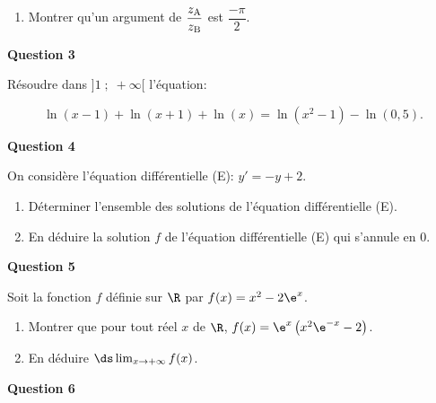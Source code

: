 \begin{enumerate}
\item Montrer qu'un argument de $\dfrac{z_{\text A}}{z_{\text B}}$ est $\dfrac{-\pi}{2}$.
\end{enumerate}

\bigskip

\textbf{Question 3}

\medskip

Résoudre dans $]1\;;\; +\infty[$ l'équation:

\[\ln\left (x-1\right ) + \ln \left (x+1\right ) + \ln\left (x\right ) = \ln \left (x^2-1\right) - \ln\left (0,5\right).\]

\bigskip

\textbf{Question 4}

\medskip

On considère l'équation différentielle (E): $y'=-y+2$.

\begin{enumerate}
\item Déterminer l'ensemble des solutions de l'équation différentielle (E).
\item En déduire la solution $f$ de l'équation différentielle (E) qui s'annule en 0.
\end{enumerate}

\bigskip

\textbf{Question 5}

\medskip

Soit la fonction $f$ définie sur $\R$ par $f(x)=x^2-2\e^{x}$.

\begin{enumerate}
\item  Montrer que pour tout réel $x$ de $\R$, $f(x)=\e^{x}\left (x^2\e^{-x}-2\right )$.
\item En déduire $\ds\lim_{x\to +\infty} f(x)$.
\end{enumerate}

\bigskip

\textbf{Question 6}

\medskip

\begin{center}
\end{center}


